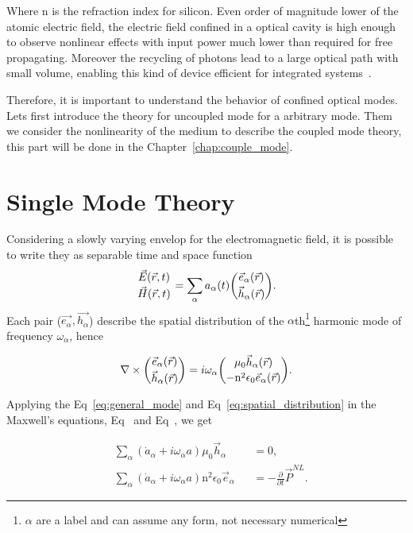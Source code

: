 Where $\text{n}$ is the refraction index for silicon. Even order of magnitude lower of the atomic electric field, the electric field confined in a optical cavity is high enough to observe nonlinear effects with input power much lower than required for free propagating\needcit. Moreover the recycling of photons lead to a large optical path with small volume, enabling this kind of device efficient for integrated systems~\needcit.  

Therefore, it is important to understand the behavior of confined optical modes. Lets first introduce the theory for uncoupled mode for a arbitrary mode. Them we consider the nonlinearity of the medium to describe the coupled mode theory, this part will be done in the Chapter~\ref{chap:couple_mode}. 

\section{Single Mode Theory}

Considering a slowly varying envelop for the electromagnetic field, it is possible to write they as separable time and space function
\begin{equation}
    \genfrac{}{}{0 pt}{}{\vec{E}(\vec{r},t)}{\vec{H}(\vec{r},t)} = \sum_\alpha a_\alpha(t)\genfrac{(}{)}{0 pt}{}{\vec{e}_\alpha(\vec{r})}{\vec{h}_\alpha(\vec{r})}.
    \label{eq:general_mode}
\end{equation}
Each pair ($\vec{e_\alpha},\vec{h_\alpha}$) describe the spatial distribution of the $\alpha$th\footnote{$\alpha$ are a label and can assume any form, not necessary numerical} harmonic mode of frequency $\omega_\alpha$, hence 

\begin{equation}
    \nabla \times \genfrac{(}{)}{0 pt}{}{\vec{e}_\alpha(\vec{r})}{\vec{h}_\alpha(\vec{r})} = i\omega_\alpha \genfrac{(}{)}{0 pt}{}{\mu_0\vec{h}_\alpha(\vec{r})}{-\n^2\epsilon_0\vec{e}_\alpha(\vec{r})}.
    \label{eq:spatial_distribution}
\end{equation}

Applying the Eq~\ref{eq:general_mode} and Eq~\ref{eq:spatial_distribution} in the Maxwell's equations, Eq~ and Eq~, we get

\begin{subequations}
    \begin{alignat}{2}
        &\sum_\alpha \left(\dot{a}_\alpha + i \omega_\alpha a\right) \mu_0 \vec{h}_\alpha &&= 0,\\
        &\sum_\alpha \left(\dot{a}_\alpha + i \omega_\alpha a\right) \text{n}^2\epsilon_0 \vec{e}_\alpha &&= -\frac{\partial}{\partial t}\vec{P}^{NL}.
    \end{alignat}
\end{subequations}

